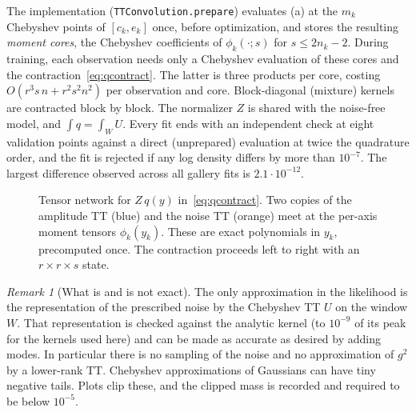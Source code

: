 \documentclass[11pt]{article}
\theoremstyle{definition}
\theoremstyle{remark}
\newtheorem{remark}[proposition]{Remark}
\begin{document}
The implementation (\texttt{TTConvolution.prepare}) evaluates (a) at the $m_k$ Chebyshev points of
$[c_k,e_k]$ once, before optimization, and stores the resulting \emph{moment cores}, the Chebyshev coefficients of
$\phi_k(\cdot;s)$ for $s\le 2n_k-2$. During training, each observation needs only a Chebyshev evaluation of these
cores and the contraction~\eqref{eq:qcontract}. The latter is three products per core, costing
$O(r^3 s\,n+r^2s^2n^2)$ per observation and core. Block-diagonal (mixture) kernels are contracted block by
block. The normalizer $Z$ is shared with the noise-free model, and $\int q=\int_W U$. Every fit ends with an
independent check at eight validation points against a direct (unprepared) evaluation at twice the quadrature
order, and the fit is rejected if any log density differs by more than $10^{-7}$. The largest difference observed
across all gallery fits is $2.1\cdot10^{-12}$.

\begin{figure}[t]
\centering
{}
\caption{Tensor network for $Z\,q(y)$ in~\eqref{eq:qcontract}. Two copies of the amplitude TT (blue) and the noise TT
(orange) meet at the per-axis moment tensors $\phi_k(y_k)$. These are exact polynomials in $y_k$, precomputed once.
The contraction proceeds left to right with an $r\times r\times s$ state.}
\label{fig:network}
\end{figure}

\begin{remark}[What is and is not exact]
The only approximation in the likelihood is the representation of the prescribed noise by the Chebyshev TT
$U$ on the window $W$. That representation is checked against the analytic kernel (to $10^{-9}$ of its peak for
the kernels used here) and can be made as accurate as desired by adding modes. In particular there is no sampling of
the noise and no approximation of $g^2$ by a lower-rank TT. Chebyshev approximations of Gaussians can have
tiny negative tails. Plots clip these, and the clipped mass is recorded and required to be below $10^{-5}$.
\end{remark}
\end{document}
